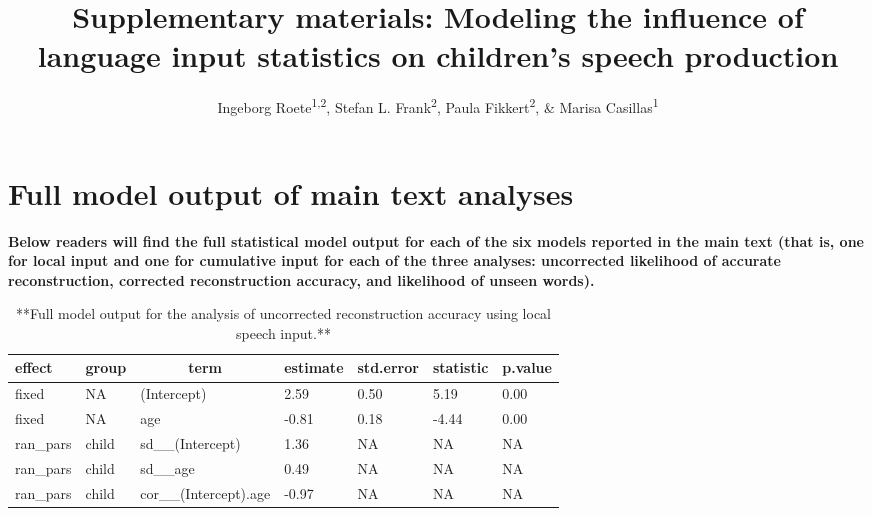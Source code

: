 \documentclass[man,mask,floatsintext]{apa6}
\title{Supplementary materials: Modeling the influence of language input
statistics on children's speech production}
\author{Ingeborg Roete\textsuperscript{1,2}, Stefan L. Frank\textsuperscript{2},
Paula Fikkert\textsuperscript{2}, \& Marisa Casillas\textsuperscript{1}}
\date{}
\affiliation{
\vspace{0.5cm}
\textsuperscript{1} Max Planck Institute for Psycholinguistics\\\textsuperscript{2} Radboud University}
\begin{document}
\maketitle

\section{Full model output of main text
analyses}\label{full-model-output-of-main-text-analyses}

\textbf{Below readers will find the full statistical model output for
each of the six models reported in the main text (that is, one for local
input and one for cumulative input for each of the three analyses:
uncorrected likelihood of accurate reconstruction, corrected
reconstruction accuracy, and likelihood of unseen words).}

\pagebreak

\begin{table}[tbp]
\begin{center}
\begin{threeparttable}
\caption{\label{tab:tab-uncorr_reconstr_acc-local-MAIN}**Full model output for the analysis of uncorrected reconstruction accuracy using local speech input.**}
\begin{tabular}{lllllll}
\toprule
effect & \multicolumn{1}{c}{group} & \multicolumn{1}{c}{term} & \multicolumn{1}{c}{estimate} & \multicolumn{1}{c}{std.error} & \multicolumn{1}{c}{statistic} & \multicolumn{1}{c}{p.value}\\
\midrule
fixed & NA & (Intercept) & 2.59 & 0.50 & 5.19 & 0.00\\
fixed & NA & age & -0.81 & 0.18 & -4.44 & 0.00\\
ran\_pars & child & sd\_\_(Intercept) & 1.36 & NA & NA & NA\\
ran\_pars & child & sd\_\_age & 0.49 & NA & NA & NA\\
ran\_pars & child & cor\_\_(Intercept).age & -0.97 & NA & NA & NA\\
\bottomrule
\end{tabular}
\end{threeparttable}
\end{center}
\end{table}
\end{document}
